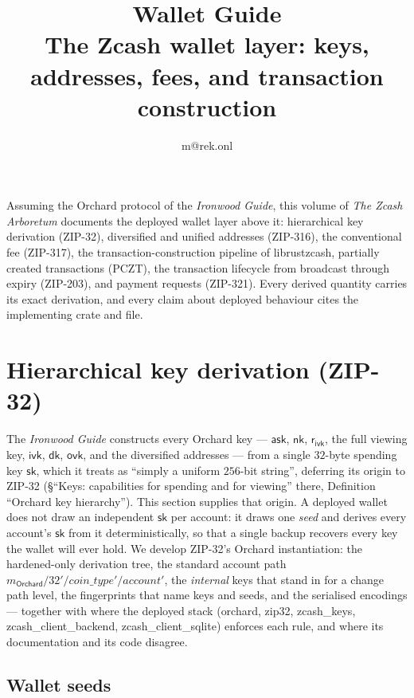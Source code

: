 \documentclass[11pt,a4paper]{article}
\title{\textbf{\Huge Wallet Guide}\\[6pt]\large The Zcash wallet layer: keys, addresses, fees, and transaction construction}
\author{m@rek.onl}
\date{}
\theoremstyle{definition}
\newcommand{\ask}{\ensuremath{\mathsf{ask}}}
\newcommand{\nksym}{\ensuremath{\mathsf{nk}}}
\newcommand{\ivk}{\ensuremath{\mathsf{ivk}}}
\newcommand{\ovk}{\ensuremath{\mathsf{ovk}}}
\newcommand{\dk}{\ensuremath{\mathsf{dk}}}
\newcommand{\rivk}{\ensuremath{\mathsf{r_{ivk}}}}
\renewenvironment{abstract}{%
  \small\begin{center}{\bfseries\abstractname}\end{center}\medskip\noindent\ignorespaces
}{\par\medskip}
\begin{document}
\maketitle
\thispagestyle{empty}
\begin{abstract}
Assuming the Orchard protocol of the \emph{Ironwood Guide}, this volume of
\emph{The Zcash Arboretum} documents the
deployed wallet layer above it: hierarchical key derivation (ZIP-32),
diversified and unified addresses (ZIP-316), the conventional fee (ZIP-317),
the transaction-construction pipeline of \textsf{librustzcash}, partially
created transactions (PCZT), the transaction lifecycle from broadcast through
expiry (ZIP-203), and payment requests (ZIP-321). Every derived quantity
carries its exact derivation, and every claim about deployed behaviour cites
the implementing crate and file.
\end{abstract}
\clearpage
\tableofcontents
\clearpage
\section{Hierarchical key derivation (ZIP-32)}\label{sec:keys-zip32}

The \emph{Ironwood Guide} constructs every Orchard key --- $\ask$, $\nksym$,
$\rivk$, the full viewing key, $\ivk$, $\dk$, $\ovk$, and the diversified
addresses --- from a single $32$-byte spending key $\mathsf{sk}$, which it
treats as ``simply a uniform $256$-bit string'', deferring its origin to
ZIP-32 (\S``Keys: capabilities for spending and for viewing'' there,
Definition ``Orchard key hierarchy''). This section supplies that origin. A
deployed wallet does not draw an independent $\mathsf{sk}$ per account: it
draws one \emph{seed} and derives every account's $\mathsf{sk}$ from it
deterministically, so that a single backup recovers every key the wallet
will ever hold. We develop ZIP-32's Orchard instantiation: the hardened-only
derivation tree, the standard account path
$m_{\mathsf{Orchard}} / 32' / \mathit{coin\_type}' / \mathit{account}'$, the
\emph{internal} keys that stand in for a change path level, the fingerprints
that name keys and seeds, and the serialised encodings --- together with
where the deployed stack (\textsf{orchard}, \textsf{zip32},
\textsf{zcash\_keys}, \textsf{zcash\_client\_backend},
\textsf{zcash\_client\_sqlite}) enforces each rule, and where its
documentation and its code disagree.

\subsection{Wallet seeds}\label{sec:zip32-seeds}
\end{document}
